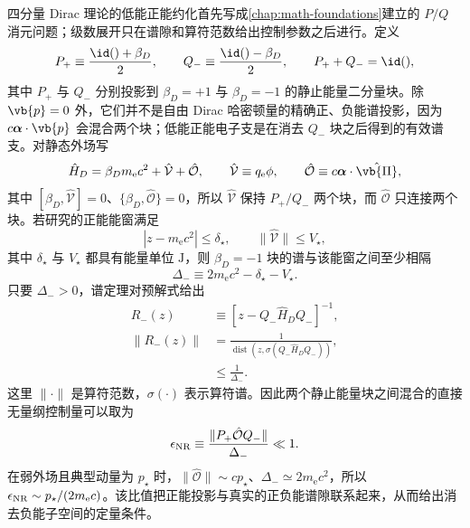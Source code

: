 四分量 Dirac 理论的低能正能约化首先写成\cref{chap:math-foundations}建立的 $P/Q$ 消元问题；级数展开只在谱隙和算符范数给出控制参数之后进行。定义
\begin{equation}
 P_+\equiv\frac{\id()+\beta_D}{2},
 \qquad
 Q_-\equiv\frac{\id()-\beta_D}{2},
 \qquad
 P_++Q_-=\id(),
 \label{eq:dirac-positive-negative-projectors-r16}
\end{equation}
其中 $P_+$ 与 $Q_-$ 分别投影到 $\beta_D=+1$ 与 $\beta_D=-1$ 的静止能量二分量块。除 $\vb{p}=0$ 外，它们并不是自由 Dirac 哈密顿量的精确正、负能谱投影，因为 $c\boldsymbol\alpha\cdot\vb{p}$ 会混合两个块；低能正能电子支是在消去 $Q_-$ 块之后得到的有效谱支。对静态外场写
\begin{equation}
 \hat H_D=\beta_Dm_{\mathrm e} c^2+\hat{\mathcal V}+\hat{\mathcal O},
 \qquad
 \hat{\mathcal V}\equiv q_{\mathrm e}\phi,
 \qquad
 \hat{\mathcal O}\equiv c\boldsymbol\alpha\cdot\hat{\vb{\Pi}},
 \label{eq:dirac-even-odd-decomposition-r16}
\end{equation}
其中 $[\beta_D,\hat{\mathcal V}]=0$、$\{\beta_D,\hat{\mathcal O}\}=0$，所以 $\hat{\mathcal V}$ 保持 $P_+/Q_-$ 两个块，而 $\hat{\mathcal O}$ 只连接两个块。若研究的正能能窗满足
\begin{equation*}
 |z-m_{\mathrm e} c^2|\le\delta_\star,
 \qquad
 \|\hat{\mathcal V}\|\le V_\star,
\end{equation*}
其中 $\delta_\star$ 与 $V_\star$ 都具有能量单位 $\mathrm J$，则 $\beta_D=-1$ 块的谱与该能窗之间至少相隔
\begin{equation*}
 \Delta_-
 \equiv2m_{\mathrm e} c^2-\delta_\star-V_\star.
\end{equation*}
只要 $\Delta_->0$，谱定理对预解式给出
\begin{align}
 R_-(z)
 &\equiv\left[z-Q_-\hat H_DQ_-\right]^{-1},\\
 \|R_-(z)\|
 &=\frac{1}{\operatorname{dist}\!\left(z,\sigma(Q_-\hat H_DQ_-)\right)},\\
 &\le\frac1{\Delta_-}.
 \label{eq:dirac-negative-resolvent-bound-r16}
\end{align}
这里 $\|\cdot\|$ 是算符范数，$\sigma(\cdot)$ 表示算符谱。因此两个静止能量块之间混合的直接无量纲控制量可以取为
\begin{equation}
 {
 \epsilon_{\rm NR}
 \equiv
 \frac{\|P_+\hat{\mathcal O}Q_-\|}{\Delta_-}\ll1.}
 \label{eq:dirac-pauli-control-r16}
\end{equation}
在弱外场且典型动量为 $p_\star$ 时，$\|\hat{\mathcal O}\|\sim cp_\star$、$\Delta_-\simeq2m_{\mathrm e} c^2$，所以 $\epsilon_{\rm NR}\sim p_\star/(2m_{\mathrm e} c)$。该比值把正能投影与真实的正负能谱隙联系起来，从而给出消去负能子空间的定量条件。

